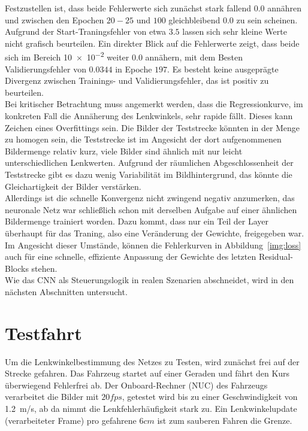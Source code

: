 Festzustellen ist, dass beide Fehlerwerte sich zunächst stark fallend $0.0$ annähren und zwischen den Epochen $20-25$ und $100$ gleichbleibend $0.0$ zu sein scheinen. Aufgrund der Start-Traningsfehler von etwa $3.5$ lassen sich sehr kleine Werte nicht grafisch beurteilen. Ein direkter Blick auf die Fehlerwerte zeigt, dass beide sich im Bereich \num{10e-2} weiter $0.0$ annähern, mit dem Besten Validierungsfehler von $0.0344$ in Epoche $197$. Es besteht keine ausgeprägte Divergenz zwischen Trainings- und Validierungsfehler, das ist positiv zu beurteilen.\\
Bei kritischer Betrachtung muss angemerkt werden, dass die Regressionkurve, im konkreten Fall die Annäherung des Lenkwinkels, sehr rapide fällt. Dieses kann Zeichen eines Overfittings sein. Die Bilder der Teststrecke könnten in der Menge zu homogen sein, die Teststrecke ist im Angesicht der dort aufgenommenen Bildermenge relativ kurz, viele Bilder sind ähnlich mit nur leicht unterschiedlichen Lenkwerten. Aufgrund der räumlichen Abgeschlossenheit der Teststrecke gibt es dazu wenig Variabilität im Bildhintergrund, das könnte die Gleichartigkeit der Bilder verstärken.\\
Allerdings ist die schnelle Konvergenz nicht zwingend negativ anzumerken, das neuronale Netz war schließlich schon mit derselben Aufgabe auf einer ähnlichen Bildermenge trainiert worden. Dazu kommt, dass nur ein Teil der Layer überhaupt für das Traning, also eine Veränderung der Gewichte, freigegeben war. Im Angesicht dieser Umstände, können die Fehlerkurven in Abbildung~\ref{img:loss} auch für eine schnelle, effiziente Anpassung der Gewichte des letzten Residual-Blocks stehen.\\
Wie das CNN als Steuerungslogik in realen Szenarien abschneidet, wird in den nächsten Abschnitten untersucht.

\section{Testfahrt}
Um die Lenkwinkelbestimmung des Netzes zu Testen, wird zunächst frei auf der Strecke gefahren. Das Fahrzeug startet auf einer Geraden und fährt den Kurs überwiegend Fehlerfrei ab. Der Onboard-Rechner (NUC) des Fahrzeugs verarbeitet die Bilder mit $20 fps$, getestet wird bis zu einer Geschwindigkeit von \SI{1.2}{\meter/\second}, ab da nimmt die Lenkfehlerhäufigkeit stark zu. Ein Lenkwinkelupdate (verarbeiteter Frame) pro gefahrene $6 cm$ ist zum sauberen Fahren die Grenze.\\
